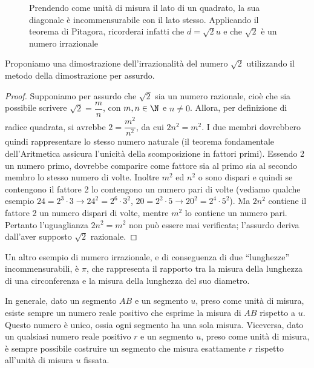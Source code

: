 \begin{enumerate}
\begin{inaccessibleblock}
 \begin{figure}[htb]
\centering
\caption{Prendendo come unità di misura il lato di un quadrato, la 
sua diagonale è incommensurabile con il lato stesso. Applicando il 
teorema di Pitagora, ricorderai infatti che \(d=\sqrt{2}u\) e che 
\(\sqrt{2}\) è un numero irrazionale}
\end{figure}
\end{inaccessibleblock}

Proponiamo una dimostrazione dell'irrazionalità del numero \(\sqrt{2}\) 
utilizzando il metodo della dimostrazione per assurdo.


\begin{proof}
Supponiamo per assurdo che \(\sqrt{2}\) sia un numero razionale, cioè 
che sia possibile scrivere \(\sqrt{2}=\dfrac{m}{n}\), con \(m,n \in 
\N\) e \(n\neq 0\). Allora, per definizione di radice quadrata, si 
avrebbe \(2=\dfrac{m^2}{n^2}\), da cui \(2n^2=m^2\). I due membri 
dovrebbero quindi rappresentare lo stesso numero naturale (il teorema 
fondamentale dell'Aritmetica assicura l'unicità della scomposizione 
in fattori primi). Essendo 2 un numero primo, dovrebbe comparire come 
fattore sia al primo sia al secondo membro lo stesso numero di volte. 
Inoltre \(m^2\) ed \(n^2\) o sono dispari e quindi se contengono il 
fattore 2 lo contengono un numero pari di volte (vediamo qualche 
esempio \(24=2^3\cdot3 \rightarrow 24^2=2^6\cdot3^2\), \(20=2^2\cdot5 
\rightarrow 20^2=2^4\cdot5^2\)). Ma \(2n^2\) contiene il fattore 2 un 
numero dispari di volte, mentre \(m^2\) lo contiene un numero pari. 
Pertanto l'uguaglianza \(2n^2=m^2\) non può essere mai verificata; 
l'assurdo deriva dall'aver supposto \(\sqrt{2}\) razionale.
\end{proof}

Un altro esempio di numero irrazionale, e di conseguenza di due 
``lunghezze'' incommensurabili, è \(\pi\), che rappresenta il rapporto 
tra la misura della lunghezza di una circonferenza e la misura della 
lunghezza del suo diametro.
\end{enumerate}

In generale, dato un segmento \(AB\) e un segmento \(u\), preso come 
unità di misura, esiste sempre un numero reale positivo che esprime 
la misura di \(AB\) rispetto a \(u\). Questo numero è unico, ossia ogni 
segmento ha una sola misura. Viceversa, dato un qualsiasi numero 
reale positivo \(r\) e un segmento \(u\), preso come unità di misura, è 
sempre possibile costruire un segmento che misura esattamente \(r\) 
rispetto all'unità di misura \(u\) fissata.

